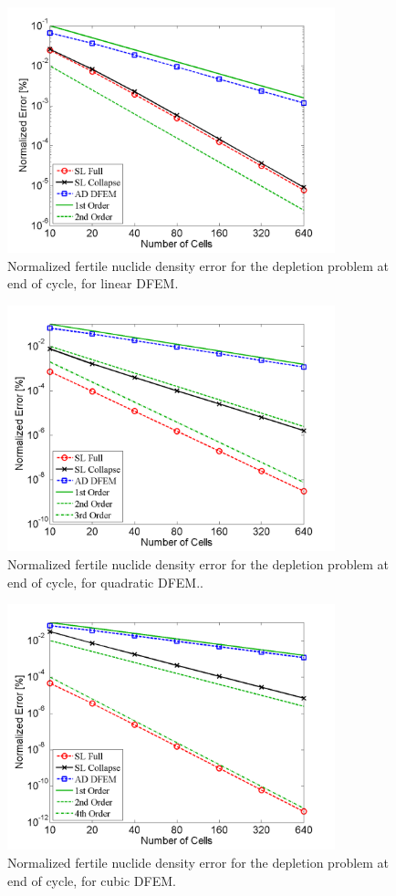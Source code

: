 \pagebreak

\begin{figure}[!htp]
\centering
\includegraphics[width=9.5cm]{chapter5_depletion/ft_P1_norm_err.png}
\caption{Normalized fertile nuclide density error for the depletion problem at end of cycle, for linear DFEM.}
\label{fig:depletion_NFT_p1}
\end{figure}
%
\begin{figure}[!hbp]
\centering
\includegraphics[width=9.5cm]{chapter5_depletion/ft_P2_norm_err.png}
\caption{Normalized fertile nuclide density error for the depletion problem at end of cycle, for quadratic DFEM..}
\label{fig:depletion_NFT_p2}
\end{figure}
%
\newpage
%
\begin{figure}[!htp]
\centering
\includegraphics[width=9.5cm]{chapter5_depletion/ft_P3_norm_err.png}
\caption{Normalized fertile nuclide density error for the depletion problem at end of cycle, for cubic DFEM.}
\label{fig:depletion_NFT_p3}
\end{figure}

